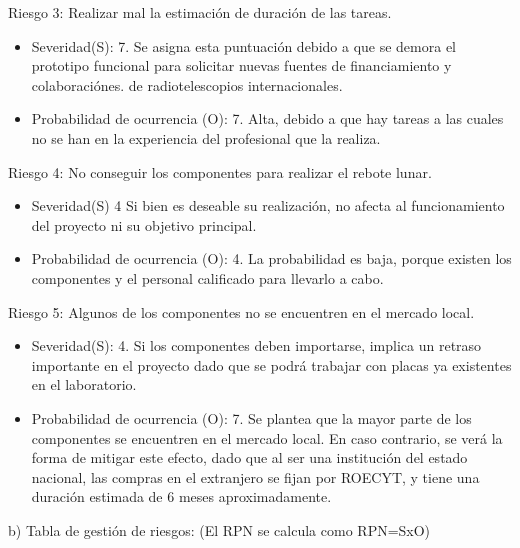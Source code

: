 \documentclass[11pt, %
codirector, %
]{charter}
\begin{document}
Riesgo 3: Realizar mal la estimación de duración de las tareas. 
\begin{itemize}
	\item Severidad(S): 7.\newline 
	Se asigna esta puntuación debido a que se demora el prototipo funcional para solicitar nuevas fuentes de financiamiento y colaboraciónes. 
	de radiotelescopios internacionales.  
	\item Probabilidad de ocurrencia (O): 7.\newline 
	Alta, debido a que hay tareas a las cuales no se han en la experiencia del profesional que la realiza.  
\end{itemize}


Riesgo 4: No conseguir los componentes para realizar el rebote lunar. 
\begin{itemize}
	\item Severidad(S) 4\newline 
		Si bien es deseable su realización, no afecta al funcionamiento del proyecto ni su objetivo principal. 
	\item Probabilidad de ocurrencia (O): 4.\newline 
		La probabilidad es baja, porque existen los componentes y el personal calificado para llevarlo a cabo. 
\end{itemize}

Riesgo 5: Algunos de los componentes no se encuentren en el mercado local. 
\begin{itemize}
	\item Severidad(S): 4.\newline 
		Si los componentes deben importarse, implica un retraso importante en el proyecto dado que se podrá trabajar con placas ya existentes en el laboratorio. 

	\item Probabilidad de ocurrencia (O): 7. \newline 
	   Se plantea que la mayor parte de los componentes se encuentren en el mercado local. En caso contrario, se verá la forma de mitigar este efecto, dado que al ser una institución del estado nacional, las compras en el extranjero se fijan por ROECYT, y tiene una duración estimada de 6 meses aproximadamente. 
\end{itemize}





b) Tabla de gestión de riesgos:      (El RPN se calcula como RPN=SxO)
\end{document}
